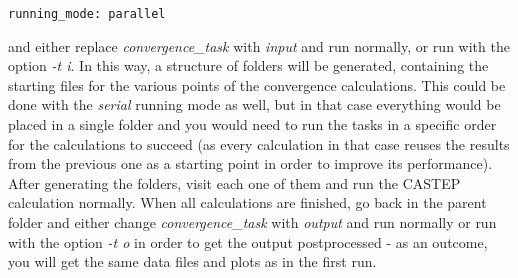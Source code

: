 \documentclass[10pt]{article}
\begin{document}
\begin{lstlisting}
running_mode: parallel
\end{lstlisting}

and either replace \textit{convergence\_task} with \textit{input} and run normally, or run with the option \textit{-t i}. In this way, a structure of folders will be generated, containing the starting files for the various points of the convergence calculations. This could be done with the \textit{serial} running mode as well, but in that case everything would be placed in a single folder and you would need to run the tasks in a specific order for the calculations to succeed (as every calculation in that case reuses the results from the previous one as a starting point in order to improve its performance). After generating the folders, visit each one of them and run the CASTEP calculation normally. When all calculations are finished, go back in the parent folder and either change \textit{convergence\_task} with \textit{output} and run normally or run with the option \textit{-t o} in order to get the output postprocessed - as an outcome, you will get the same data files and plots as in the first run.
\end{document}
